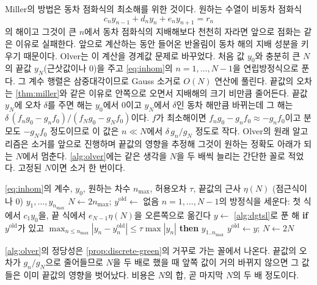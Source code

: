 Miller의 방법은 동차 점화식의 최소해를 위한 것이다. 원하는 수열이 비동차 점화식
\begin{equation}
\label{eq:inhom}
c_ny_{n-1}+d_ny_n+e_ny_{n+1}=r_n
\end{equation}
의 해이고 그것이 큰 $n$에서 동차 점화식의 지배해보다 천천히 자라면 앞으로 점화는 같은 이유로 실패한다. 앞으로 계산하는 동안 들어온 반올림이 동차 해의 지배 성분을 키우기 때문이다. Olver\cite{olver1967difference}는 이 계산을 경계값 문제로 바꾸었다. 처음 값 $y_0$와 충분히 큰 $N$의 끝값 $y_N$(근삿값이나 $0$)을 주고 \cref{eq:inhom}의 $n=1,\dots,N-1$을 연립방정식으로 푼다. 그 계수 행렬은 삼중대각이므로 Gauss 소거로 $O(N)$ 연산에 풀린다. 끝값의 오차는 \cref{thm:miller}와 같은 이유로 안쪽으로 오면서 지배해의 크기 비만큼 줄어든다. 끝값 $y_N$에 오차 $\delta$를 주면 해는 $y_0$에서 $0$이고 $y_N$에서 $\delta$인 동차 해만큼 바뀌는데 그 해는 $\delta\,(f_ng_0-g_nf_0)/(f_Ng_0-g_Nf_0)$이다. $f$가 최소해이면 $f_ng_0-g_nf_0\approx-g_nf_0$이고 분모도 $-g_Nf_0$ 정도이므로 이 값은 $n\ll N$에서 $\delta\,g_n/g_N$ 정도로 작다. Olver의 원래 알고리즘은 소거를 앞으로 진행하며 끝값의 영향을 추정해 그것이 원하는 정확도 아래가 되는 $N$에서 멈춘다. \cref{alg:olver}에는 같은 생각을 $N$을 두 배씩 늘리는 간단한 꼴로 적었다. 고정된 $N$이면 소거 한 번이다.

\begin{algorithm}[htbp]
\begin{algorithmic}[1]
\Require \cref{eq:inhom}의 계수, $y_0$, 원하는 차수 $n_{\max}$, 허용오차 $\tau$, 끝값의 근사 $\eta(N)$ (점근식이나 $0$)
\Ensure $y_1,\dots,y_{n_{\max}}$
\State $N\gets2n_{\max}$; $y^{\mathrm{old}}\gets$ 없음
\Loop
  \State $n=1,\dots,N-1$의 방정식을 세운다: 첫 식에서 $c_1y_0$을, 끝 식에서 $e_{N-1}\eta(N)$을 오른쪽으로 옮긴다
  \State $y\gets$ \cref{alg:dgtsl}로 푼 해 
  \State \textbf{if} $y^{\mathrm{old}}$가 있고 $\max_{n\le n_{\max}}|y_n-y^{\mathrm{old}}_n|\le\tau\max|y_n|$ \textbf{then} \Return $y_{1..n_{\max}}$
  \State $y^{\mathrm{old}}\gets y$; $N\gets2N$
\EndLoop
\end{algorithmic}
\caption{끝값을 멀리 두는 경계값 풀이 (Olver의 방법을 단순화한 꼴)}
\label{alg:olver}
\end{algorithm}

\cref{alg:olver}의 정당성은 \cref{prop:discrete-green}의 거꾸로 가는 꼴에서 나온다. 끝값의 오차가 $g_n/g_N$으로 줄어들므로 $N$을 두 배로 했을 때 앞쪽 값이 거의 바뀌지 않으면 그 값들은 이미 끝값의 영향을 벗어났다. 비용은 $N$의 합, 곧 마지막 $N$의 두 배 정도이다.

